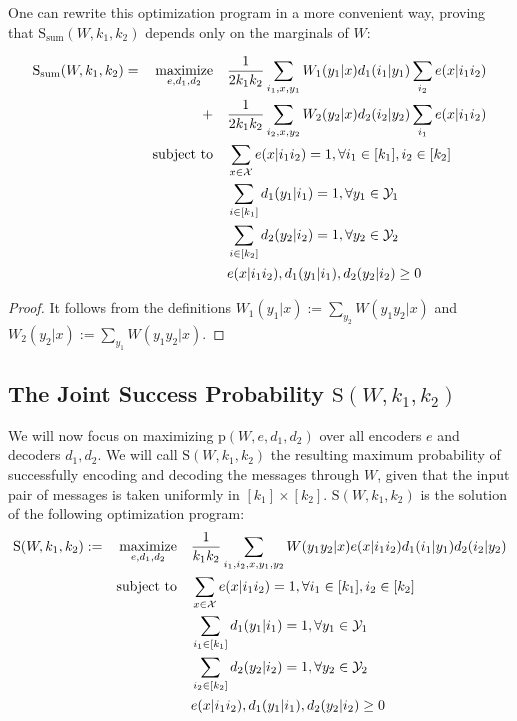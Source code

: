 One can rewrite this optimization program in a more convenient way, proving that $\mathrm{S}_{\text{sum}}(W,k_1,k_2)$ depends only on the marginals of $W$:
\begin{proposition}
  \begin{equation}
  \begin{aligned}
    \mathrm{S}_{\text{sum}}(W,k_1,k_2) = &&\underset{e,d_1,d_2}{\operatorname{\text{maximize}}} &&& \frac{1}{2k_1k_2}\sum_{i_1,x,y_1} W_1(y_1|x)d_1(i_1|y_1)\sum_{i_2} e(x|i_1i_2)\\
    &&+&&& \frac{1}{2k_1k_2}\sum_{i_2,x,y_2} W_2(y_2|x)d_2(i_2|y_2)\sum_{i_1} e(x|i_1i_2)\\
    &&\operatorname{\text{subject to}} &&& \sum_{x \in \mathcal{X}} e(x|i_1i_2) = 1, \forall i_1 \in [k_1], i_2 \in [k_2]\\
    &&&&& \sum_{i \in [k_1]} d_1(y_1|i_1) = 1, \forall y_1 \in \mathcal{Y}_1\\
    &&&&& \sum_{i \in [k_2]} d_2(y_2|i_2) = 1, \forall y_2 \in \mathcal{Y}_2\\
    &&&&& e(x|i_1i_2), d_1(y_1|i_1), d_2(y_2|i_2) \geq 0
  \end{aligned}
  \end{equation}
\end{proposition}

\begin{proof}
  It follows from the definitions $W_1(y_1|x) := \sum_{y_2} W(y_1y_2|x)$ and $W_2(y_2|x) := \sum_{y_1} W(y_1y_2|x)$.
\end{proof}

\subsection{The Joint Success Probability $\mathrm{S}(W,k_1,k_2)$}
We will now focus on maximizing $\mathrm{p}(W,e,d_1,d_2)$ over all encoders $e$ and decoders $d_1,d_2$. We will call $\mathrm{S}(W,k_1,k_2)$ the resulting maximum probability of successfully encoding and decoding the messages through $W$, given that the input pair of messages is taken uniformly in $[k_1] \times [k_2]$. $\mathrm{S}(W,k_1,k_2)$ is the solution of the following optimization program:
\begin{equation}
  \begin{aligned}
    \mathrm{S}(W,k_1,k_2) := &&\underset{e,d_1,d_2}{\operatorname{\text{maximize}}} &&& \frac{1}{k_1k_2}\sum_{i_1,i_2,x,y_1,y_2} W(y_1y_2|x)e(x|i_1i_2)d_1(i_1|y_1)d_2(i_2|y_2)\\
    &&\operatorname{\text{subject to}} &&& \sum_{x \in \mathcal{X}} e(x|i_1i_2) = 1, \forall i_1 \in [k_1], i_2 \in [k_2]\\
    &&&&& \sum_{i_1 \in [k_1]} d_1(y_1|i_1) = 1, \forall y_1 \in \mathcal{Y}_1\\
    &&&&& \sum_{i_2 \in [k_2]} d_2(y_2|i_2) = 1, \forall y_2 \in \mathcal{Y}_2\\
    &&&&& e(x|i_1i_2), d_1(y_1|i_1), d_2(y_2|i_2) \geq 0
  \end{aligned}
\end{equation}

